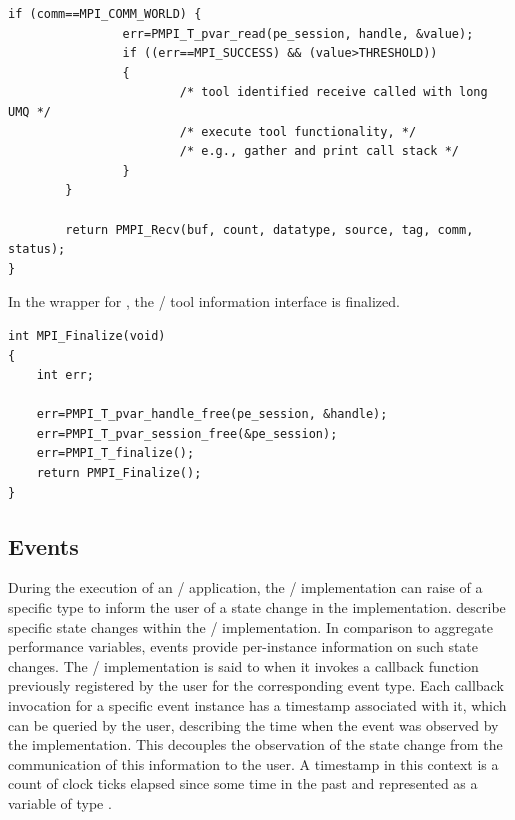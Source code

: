 \begin{example}
\begin{lstlisting}[language={[MPI]C},basicstyle=\lstsmall]
        if (comm==MPI_COMM_WORLD) {
                err=PMPI_T_pvar_read(pe_session, handle, &value);
                if ((err==MPI_SUCCESS) && (value>THRESHOLD))
                {
                        /* tool identified receive called with long UMQ */
                        /* execute tool functionality, */
                        /* e.g., gather and print call stack */
                }
        }

        return PMPI_Recv(buf, count, datatype, source, tag, comm, status);
}
\end{lstlisting}

In the wrapper for , the \MPI/ tool information
interface is finalized.

\begin{lstlisting}[language={[MPI]C}]
int MPI_Finalize(void)
{
    int err;

    err=PMPI_T_pvar_handle_free(pe_session, &handle);
    err=PMPI_T_pvar_session_free(&pe_session);
    err=PMPI_T_finalize();
    return PMPI_Finalize();
}
\end{lstlisting}


\end{example}

\subsection{Events}
\label{sec:mpit:events}

During the execution of an \MPI/ application, the \MPI/ implementation can
raise 
 of a specific type to inform the user of a state change
in the implementation.  
describe specific state changes
within the \MPI/ implementation.  In comparison to aggregate performance
variables, events provide per-instance information on such state changes.
The \MPI/ implementation is said to  when it invokes a
callback function previously registered by the user for the corresponding event
type.  Each callback invocation for a specific event instance has a
timestamp associated with it, which can be queried by the user, describing
the time when the event was observed by the implementation. This decouples
the observation of the state change from the communication of this
information to the user.  A timestamp in this context is a count of clock
ticks elapsed since some time in the past and represented as a variable of
type .


